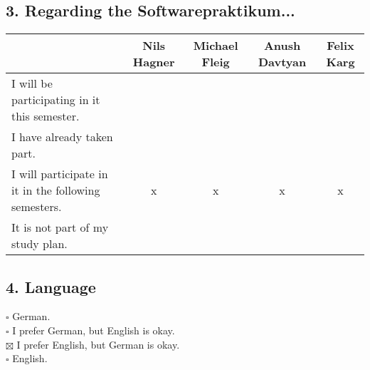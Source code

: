 \documentclass{scrartcl}
\begin{document}
\subsection*{3. Regarding the Softwarepraktikum...}
\begin{tabular} {| p{7cm} | c | c | c | c |}
	\hline
	&Nils Hagner&Michael Fleig&Anush Davtyan&Felix Karg\\
	\hline
	I will be participating in it this semester. &&&&\\
	\hline
	I have already taken part. &&&&\\
	\hline
	I will participate in it in the following semesters. &x&x&x&x\\
	\hline
	It is not part of my study plan. &&&&\\
	\hline
\end{tabular}

\subsection*{4. Language}
$\square$ German.\\
$\square$ I prefer German, but English is okay.\\
$\boxtimes$ I prefer English, but German is okay.\\
$\square$ English.\\
\end{document}

